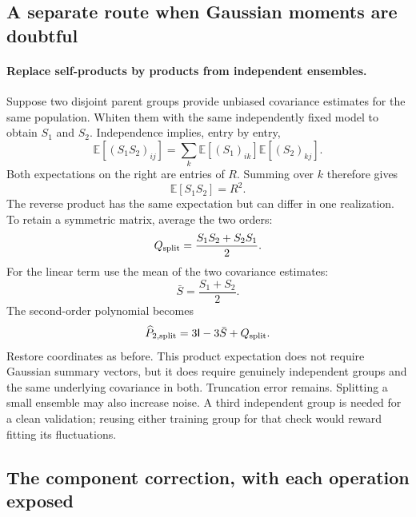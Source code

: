 \documentclass[11pt]{article}
\newcommand{\I}{\mathsf{I}}
\newcommand{\E}{\mathbb{E}}
\begin{document}
\subsection{A separate route when Gaussian moments are doubtful}
\paragraph{Replace self-products by products from independent ensembles.}
Suppose two disjoint parent groups provide unbiased covariance estimates
for the same population. Whiten them with the same independently fixed
model to obtain $S_1$ and $S_2$. Independence implies, entry by entry,
\begin{equation}
 \E[(S_1S_2)_{ij}]
      =\sum_k\E[(S_1)_{ik}]\E[(S_2)_{kj}].
\end{equation}
Both expectations on the right are entries of $R$. Summing over $k$
therefore gives
\begin{equation}
 \E[S_1S_2]=R^2.
\end{equation}
The reverse product has the same expectation but can differ in one
realization. To retain a symmetric matrix, average the two orders:
\begin{equation}
 Q_{\rm split}=\frac{S_1S_2+S_2S_1}{2}.
\end{equation}
For the linear term use the mean of the two covariance estimates:
\begin{equation}
 \bar S=\frac{S_1+S_2}{2}.
\end{equation}
The second-order polynomial becomes
\begin{equation}
 \widehat P_{2,\rm split}=3\I-3\bar S+Q_{\rm split}.
\end{equation}
Restore coordinates as before. This product expectation does not require
Gaussian summary vectors, but it does require genuinely independent groups
and the same underlying covariance in both. Truncation error remains.
Splitting a small ensemble may also increase noise. A third independent
group is needed for a clean validation; reusing either training group for
that check would reward fitting its fluctuations.

\subsection{The component correction, with each operation exposed}
\label{sec:component-steps}
\end{document}
